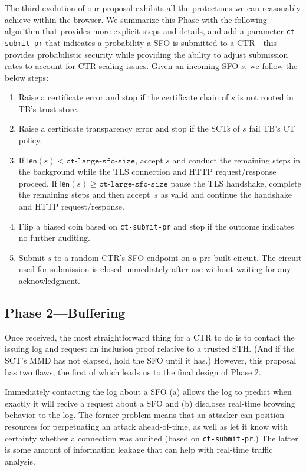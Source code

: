 The third evolution of our proposal exhibits all the protections we can reasonably achieve within the browser. We summarize this Phase with the following algorithm that provides more explicit steps and details, and add a parameter \texttt{ct-submit-pr} that indicates a probability a SFO is submitted to a CTR - this provides probabilistic security while providing the ability to adjust submission rates to account for CTR scaling issues. Given an incoming SFO $s$, we follow the below steps: %

\begin{enumerate}
    \item Raise a certificate error and stop if the certificate chain of $s$
        is not rooted in TB's trust store.
    \item Raise a certificate transparency error and stop if the SCTs of $s$
        fail TB's CT policy.
    \item If $\mathsf{len}(s) < \texttt{ct-large-sfo-size}$, accept $s$ and
        conduct the remaining steps in the background while the TLS connection
        and HTTP request/response proceed. If $\mathsf{len}(s) \geq \texttt{ct-large-sfo-size}$ pause the TLS handshake, complete the remaining steps and then
        accept~$s$ as valid and continue the handshake and HTTP request/response.
    \item Flip a biased coin based on \texttt{ct-submit-pr} and stop if the
        outcome indicates no further auditing.
    \item Submit $s$ to a random CTR's SFO-endpoint on a pre-built circuit.
        The circuit used for submission is closed immediately after use without
        waiting for any acknowledgment.
\end{enumerate}

\subsection{Phase 2---Buffering} \label{sec:base:phase2}

Once received, the most straightforward thing for a CTR to do is to contact the
issuing log and request an inclusion proof relative to a trusted STH. (And if the
SCT's MMD has not elapsed, hold the SFO until it has.) However, this proposal has
two flaws, the first of which leads us to the final design of Phase 2.

Immediately contacting the log about a SFO (a) allows the log to predict when exactly
it will recive a request about a SFO and (b) discloses real-time browsing behavior
to the log. The former problem means that an attacker can position resources for
perpetuating an attack ahead-of-time, as well as let it know with certainty whether a
connection was audited (based on \texttt{ct-submit-pr}.) The latter is some amount
of information leakage that can help with real-time traffic analysis. 

